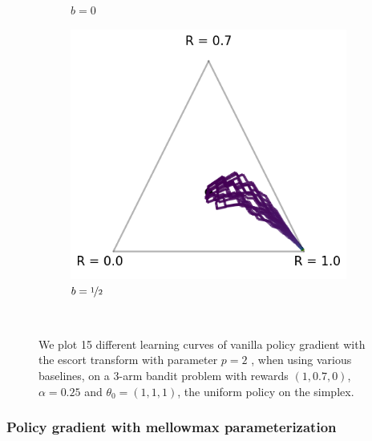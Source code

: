 \begin{figure}[!ht]
\begin{subfigure}[b]{0.3\linewidth}
    \caption{$b = 0$}
  \end{subfigure}
  \begin{subfigure}[b]{0.3\linewidth}
    \includegraphics[width=\textwidth]{articles/baselines/figs/escort_transform/escort_vanilla_minvar_05.png}
    \caption{$b = \nicefrac{1}{2}$}
  \end{subfigure}
  \caption{We plot 15 different learning curves of vanilla policy gradient with the escort transform with parameter $p=2$ \citep{mei2020escaping}, when using various baselines, on a 3-arm bandit problem with rewards $(1, 0.7, 0)$, $\alpha = 0.25$ and $\theta_0 = (1,1,1)$, the uniform policy on the simplex.}~\label{appfig:learning_curves_escort_simplex}
\end{figure}




\subsubsection*{Policy gradient with mellowmax parameterization}

